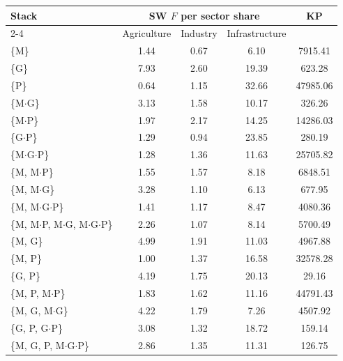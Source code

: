 \begin{tabular}{@{}lcccc@{}}
\toprule
Stack & \multicolumn{3}{c}{SW $F$ per sector share} & KP \\
\cmidrule(lr){2-4}
 & Agriculture & Industry & Infrastructure & \\
\midrule
\{M\} & 1.44 & 0.67 & 6.10 & 7915.41 \\
\{G\} & 7.93 & 2.60 & 19.39 & 623.28 \\
\{P\} & 0.64 & 1.15 & 32.66 & 47985.06 \\
\{M$\cdot$G\} & 3.13 & 1.58 & 10.17 & 326.26 \\
\{M$\cdot$P\} & 1.97 & 2.17 & 14.25 & 14286.03 \\
\{G$\cdot$P\} & 1.29 & 0.94 & 23.85 & 280.19 \\
\{M$\cdot$G$\cdot$P\} & 1.28 & 1.36 & 11.63 & 25705.82 \\
\addlinespace
\{M, M$\cdot$P\} & 1.55 & 1.57 & 8.18 & 6848.51 \\
\{M, M$\cdot$G\} & 3.28 & 1.10 & 6.13 & 677.95 \\
\{M, M$\cdot$G$\cdot$P\} & 1.41 & 1.17 & 8.47 & 4080.36 \\
\{M, M$\cdot$P, M$\cdot$G, M$\cdot$G$\cdot$P\} & 2.26 & 1.07 & 8.14 & 5700.49 \\
\addlinespace
\{M, G\} & 4.99 & 1.91 & 11.03 & 4967.88 \\
\{M, P\} & 1.00 & 1.37 & 16.58 & 32578.28 \\
\{G, P\} & 4.19 & 1.75 & 20.13 & 29.16 \\
\addlinespace
\{M, P, M$\cdot$P\} & 1.83 & 1.62 & 11.16 & 44791.43 \\
\{M, G, M$\cdot$G\} & 4.22 & 1.79 & 7.26 & 4507.92 \\
\{G, P, G$\cdot$P\} & 3.08 & 1.32 & 18.72 & 159.14 \\
\{M, G, P, M$\cdot$G$\cdot$P\} & 2.86 & 1.35 & 11.31 & 126.75 \\
\bottomrule
\end{tabular}
